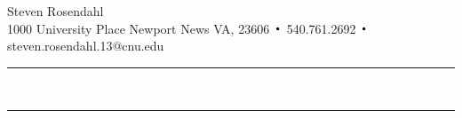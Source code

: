\documentclass{hw}
\DeclareMathOperator*{\Bigcdot}{\scalerel*{\cdot}{\bigodot}}
\begin{document}
\noindent
\begin{center}
{\huge Steven Rosendahl}\\
{\small 1000 University Place Newport News VA, 23606 $\Bigcdot$ 540.761.2692 $\Bigcdot$
steven.rosendahl.13@cnu.edu}\\
\end{center}
\hrule
\noindent \\

\hrule
\noindent \\

\end{document}
